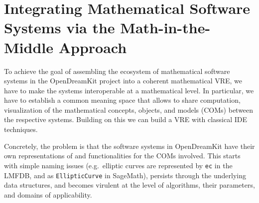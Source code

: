 \documentclass{llncs}
\def\pn{OpenDreamKit\xspace}
\begin{document}


\section{Integrating Mathematical Software Systems via the Math-in-the-Middle Approach}



To achieve the goal of assembling the ecosystem of mathematical software systems in the
\pn project into a coherent mathematical VRE, we have to make the systems interoperable at
a mathematical level. In particular, we have to establish a common meaning space that
allows to share computation, visualization of the mathematical concepts, objects, and
models (COMs) between the respective systems. Building on this we can build a VRE with
classical IDE techniques. 

Concretely, the problem is that the software systems in \pn have their own representations
of and functionalities for the COMs involved. This starts with simple naming issues
(e.g.\ elliptic curves are represented by \lstinline|ec| in the LMFDB, and as
\lstinline|EllipticCurve| in SageMath), persists through the underlying data structures,
and becomes virulent at the level of algorithms, their parameters, and domains of
applicability.


\end{document}
